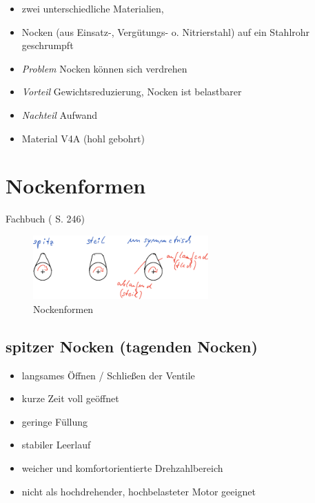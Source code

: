 \begin{itemize}
\item
  zwei unterschiedliche Materialien,
\item
  Nocken (aus Einsatz-, Vergütungs- o. Nitrierstahl) auf ein Stahlrohr
  geschrumpft
\item
  \emph{Problem} Nocken können sich verdrehen
\item
  \emph{Vorteil} Gewichtsreduzierung, Nocken ist belastbarer
\item
  \emph{Nachteil} Aufwand
\item
  Material V4A (hohl gebohrt)
\end{itemize}

\section{Nockenformen}\label{nockenformen}

Fachbuch (\textcite{brand:2020:fachkundeKfz} S. 246)

\begin{figure}[!ht]%
\centering
\includegraphics[width=0.6\textwidth]{images/Skizze/02_Nockenformen_Skizze.pdf}
\caption{Nockenformen}
\end{figure}

\subsection{spitzer Nocken (tagenden
Nocken)}\label{spitzer-nocken-tagenden-nocken}

\begin{itemize}
\item
  langsames Öffnen / Schließen der Ventile
\item
  kurze Zeit voll geöffnet\\
\item
  geringe Füllung
\item
  stabiler Leerlauf
\item
  weicher und komfortorientierte Drehzahlbereich
\item
  nicht als hochdrehender, hochbelasteter Motor geeignet
\end{itemize}

